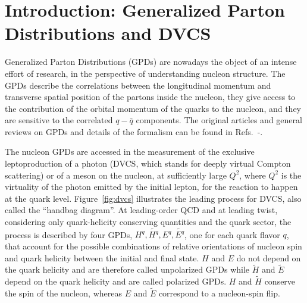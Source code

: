 \section{Introduction: Generalized Parton Distributions and DVCS}
Generalized Parton Distributions (GPDs) are nowadays the object of an intense 
effort of research, in the perspective of understanding nucleon structure.
The GPDs describe the correlations between the longitudinal momentum and transverse spatial position of the partons inside the nucleon, they give access to
the contribution of the orbital momentum of the quarks to the nucleon, and they are sensitive to the correlated $q-\bar{q}$ components.
The original articles and general reviews on GPDs and details of the formalism can be found in Refs.~\cite{muller}-\cite{revrady}.%

The nucleon GPDs are accessed in the measurement of the exclusive leptoproduction of a photon (DVCS, which stands for deeply virtual Compton scattering) or of a meson on the nucleon, at sufficiently large $Q^2$, where $Q^2$ is the virtuality of the photon emitted by the initial lepton, for the reaction to happen at the quark level. Figure~\ref{fig:dvcs} illustrates the leading process for DVCS, also called the ``handbag diagram''. At leading-order QCD and at leading twist, considering only quark-helicity conserving quantities and the quark sector, the process is described by four GPDs, $H^q, \tilde{H^q} , E^q, \tilde{E^q}$, one for each quark flavor $q$, that account for the possible combinations of relative orientations of nucleon spin and quark helicity between the initial and final state. $H$ and $E$ do not depend on the quark helicity and are therefore called unpolarized GPDs while $\tilde{H}$ and $\tilde{E}$ depend on the quark helicity and are called polarized GPDs. $H$ and $\tilde{H}$ conserve the spin of the nucleon, whereas $E$ and $\tilde{E}$ correspond to a nucleon-spin flip.

